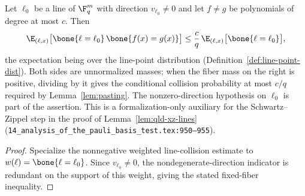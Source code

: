 \begin{lemma}
	\label{lem:nondegenerate-fiber-line-collision}
	\leanok
	Let $\ell_0$ be a line of $\F_q^m$ with direction $v_{\ell_0} \ne 0$ and
	let $f \ne g$ be polynomials of degree at most $c$. Then
	\[
		\E_{(\ell,x)}\bigl[\bone{\ell = \ell_0}\,\bone{f(x) = g(x)}\bigr]
		\le \frac{c}{q}\,
			\E_{(\ell,x)}\bigl[\bone{\ell = \ell_0}\bigr],
	\]
	the expectation being over the line-point distribution
	(Definition~\ref{def:line-point-dist}). Both sides are unnormalized
	masses; when the fiber mass on the right is positive, dividing by it gives
	the conditional collision probability at most $c/q$ required by
	Lemma~\ref{lem:pasting}. The nonzero-direction hypothesis on $\ell_0$ is
	part of the assertion. This is a formalization-only auxiliary for the
	Schwartz--Zippel step in the proof of Lemma~\ref{lem:qld-xz-lines}
	(\texttt{14\_analysis\_of\_the\_pauli\_basis\_test.tex:950--955}).
\end{lemma}
\begin{proof}
	\leanok
	Specialize the nonnegative weighted line-collision estimate to
	$w(\ell)=\bone{\ell=\ell_0}$. Since $v_{\ell_0}\ne0$, the
	nondegenerate-direction indicator is redundant on the support of this
	weight, giving the stated fixed-fiber inequality.
\end{proof}

